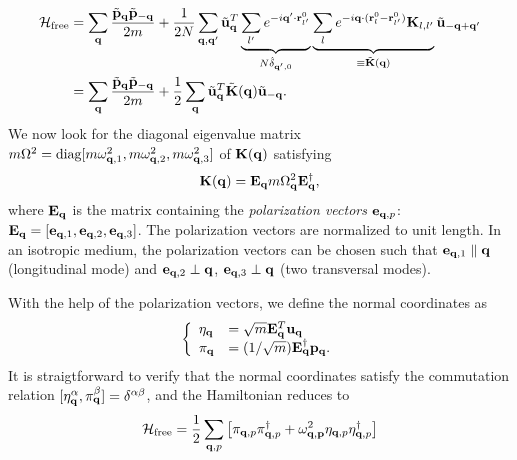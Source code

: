 \begin{alignat}{2}
 \mathcal{H}_{\textrm{free}} &= \sum_{\mathbf{q}} \frac{\tilde{\mathbf{p}}_{\mathbf{q}} \tilde{\mathbf{p}}_{-\mathbf{q}}}{2m} + \frac{1}{2N} \sum_{\mathbf{q},\mathbf{q}'} \tilde{\mathbf{u}}_{\mathbf{q}}^T \underbrace{ \sum_{l'} e^{-i\mathbf{q}' \cdot \mathbf{r}^0_{l'}}}_{N\hat \delta_{\mathbf{q}',0}} \underbrace{ \sum_{l} e^{-i \mathbf{q} \cdot (\mathbf{r}^0_l-\mathbf{r}^0_{l'})} \mathbf{K}_{l,l'}}_{\equiv \tilde{\mathbf{K}}(\mathbf{q})}  \tilde{\mathbf{u}}_{-\mathbf{q}+\mathbf{q}'} \\
 &=   \sum_{\mathbf{q}} \frac{\tilde{\mathbf{p}}_{\mathbf{q}} \tilde{\mathbf{p}}_{-\mathbf{q}}}{2m} +\frac{1}{2} \sum_{\mathbf{q}} \tilde{\mathbf{u}}_{\mathbf{q}}^T \tilde{\mathbf{K}}(\mathbf{q}) \tilde{\mathbf{u}}_{-\mathbf{q}}.
\end{alignat}
We now look for the diagonal eigenvalue matrix $m\Omega^2=\textrm{diag}[m\omega_{\mathbf{q},1}^2,m\omega_{\mathbf{q},2}^2,m\omega_{\mathbf{q},3}^2]$ of $\mathbf{K}(\mathbf{q})$ satisfying
\begin{equation}
 \mathbf{K}(\mathbf{q}) = \mathbf{E}_{\mathbf{q}} m\Omega_{\mathbf{q}}^2 \mathbf{E}_{\mathbf{q}}^{\dagger},
\end{equation}
where $\mathbf{E}_{\mathbf{q}}$ is the matrix containing the \textit{polarization vectors} $\mathbf{e}_{\mathbf{q},p}$: $\mathbf{E}_{\mathbf{q}}=[\mathbf{e}_{\mathbf{q},1},\mathbf{e}_{\mathbf{q},2},\mathbf{e}_{\mathbf{q},3}]$. The polarization vectors are normalized to unit length. In an isotropic medium, the polarization vectors can be chosen such that $\mathbf{e}_{\mathbf{q},1}\parallel \mathbf{q}$ (longitudinal mode) and $\mathbf{e}_{\mathbf{q},2}\perp \mathbf{q}$, $\mathbf{e}_{\mathbf{q},3}\perp \mathbf{q}$ (two transversal modes).

With the help of the polarization vectors, we define the normal coordinates as
\begin{equation}
 \left\{
\begin{array}{ll}
  \eta_{\mathbf{q}} &= \sqrt{m} \mathbf{E}_{\mathbf{q}}^{T} \mathbf{u}_{\mathbf{q}} \\
  \pi_{\mathbf{q}} &= (1/\sqrt{m}) \mathbf{E}_{\mathbf{q}}^{\dagger} \mathbf{p}_{\mathbf{q}} .
 \end{array}
\right.
\label{eq:normal_coord_def}
\end{equation}
It is straigtforward to verify that the normal coordinates satisfy the commutation relation $[\eta_{\mathbf{q}}^{\alpha}, \pi_{\mathbf{q}}^{\beta}]=\delta^{\alpha\beta}$, and the Hamiltonian reduces to 
\begin{equation}
 \mathcal{H}_{\textrm{free}} = \frac{1}{2} \sum_{\mathbf{q},p} \left[ \pi_{\mathbf{q},p} \pi_{\mathbf{q},p}^{\dagger} + \omega_{\mathbf{q,p}}^2 \eta_{\mathbf{q},p}  \eta_{\mathbf{q},p}^{\dagger} \right] \label{eq:Hfree_normal}
\end{equation}

